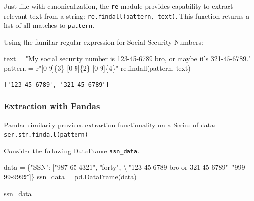\documentclass[
  letterpaper,
  DIV=11,
  numbers=noendperiod]{scrreprt}
\newenvironment{Shaded}{\begin{snugshade}}{\end{snugshade}}
\newcommand{\NormalTok}[1]{\textcolor[rgb]{0.00,0.23,0.31}{#1}}
\newcommand{\OperatorTok}[1]{\textcolor[rgb]{0.37,0.37,0.37}{#1}}
\newcommand{\SpecialCharTok}[1]{\textcolor[rgb]{0.37,0.37,0.37}{#1}}
\newcommand{\StringTok}[1]{\textcolor[rgb]{0.13,0.47,0.30}{#1}}
\newcommand{\VerbatimStringTok}[1]{\textcolor[rgb]{0.13,0.47,0.30}{#1}}
\begin{document}
Just like with canonicalization, the \texttt{re} module provides
capability to extract relevant text from a string:
\texttt{re.findall(pattern,\ text)}. This function returns a list of all
matches to \texttt{pattern}.

Using the familiar regular expression for Social Security Numbers:

\begin{Shaded}
\begin{Highlighting}[]
\NormalTok{text }\OperatorTok{=} \StringTok{"My social security number is 123{-}45{-}6789 bro, or maybe it’s 321{-}45{-}6789."}
\NormalTok{pattern }\OperatorTok{=} \VerbatimStringTok{r"[0{-}9]}\SpecialCharTok{\{3\}}\VerbatimStringTok{{-}[0{-}9]}\SpecialCharTok{\{2\}}\VerbatimStringTok{{-}[0{-}9]}\SpecialCharTok{\{4\}}\VerbatimStringTok{"}
\NormalTok{re.findall(pattern, text)  }
\end{Highlighting}
\end{Shaded}

\begin{verbatim}
['123-45-6789', '321-45-6789']
\end{verbatim}

\hypertarget{extraction-with-pandas}{%
\subsubsection{Extraction with Pandas}\label{extraction-with-pandas}}

Pandas similarily provides extraction functionality on a Series of data:
\texttt{ser.str.findall(pattern)}

Consider the following DataFrame \texttt{ssn\_data}.

\begin{Shaded}
\begin{Highlighting}[]
\NormalTok{data }\OperatorTok{=}\NormalTok{ \{}\StringTok{"SSN"}\NormalTok{: [}\StringTok{"987{-}65{-}4321"}\NormalTok{, }\StringTok{"forty"}\NormalTok{, }\OperatorTok{\textbackslash{}}
                \StringTok{"123{-}45{-}6789 bro or 321{-}45{-}6789"}\NormalTok{,}
               \StringTok{"999{-}99{-}9999"}\NormalTok{]\}}
\NormalTok{ssn\_data }\OperatorTok{=}\NormalTok{ pd.DataFrame(data)}
\end{Highlighting}
\end{Shaded}

\begin{Shaded}
\begin{Highlighting}[]
\NormalTok{ssn\_data}
\end{Highlighting}
\end{Shaded}
\end{document}

